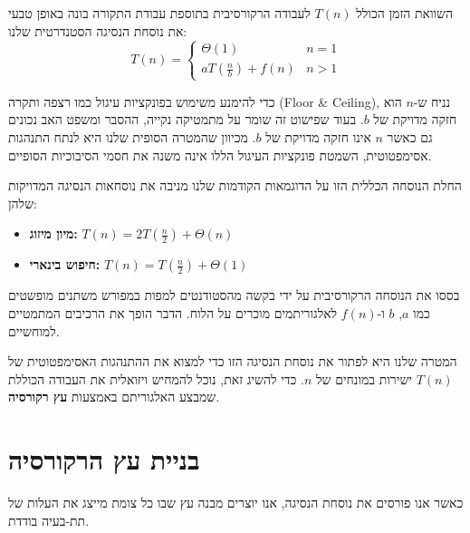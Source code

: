 \documentclass[11pt, a4paper]{article}
\begin{document}
השוואת הזמן הכולל $T(n)$ לעבודה הרקורסיבית בתוספת עבודת התקורה בונה באופן טבעי את נוסחת הנסיגה הסטנדרטית שלנו:
\[T(n)=\begin{cases}
    \Theta(1)  & n = 1 \\
   aT(\frac{n}{b})+f(n) & n>1
\end{cases}
\]

כדי להימנע משימוש בפונקציות עיגול כמו רצפה ותקרה (\textenglish{Floor \& Ceiling}), נניח ש-$n$ הוא חזקה מדויקת של $b$. בעוד שפישוט זה שומר על מתמטיקה נקייה, ההסבר ומשפט האב נכונים גם כאשר $n$ אינו חזקה מדויקת של $b$. מכיוון שהמטרה הסופית שלנו היא לנתח התנהגות אסימפטוטית, השמטת פונקציות העיגול הללו אינה משנה את חסמי הסיבוכיות הסופיים.

החלת הנוסחה הכללית הזו על הדוגמאות הקודמות שלנו מניבה את נוסחאות הנסיגה המדויקות שלהן:
\begin{itemize}
    \item \textbf{מיון מיזוג:} $T(n) = 2T\left(\frac{n}{2}\right) + \Theta(n)$
    \item \textbf{חיפוש בינארי:} $T(n) = T\left(\frac{n}{2}\right) + \Theta(1)$
\end{itemize}

\vspace{0.3cm}
\begin{educatortip}
בססו את הנוסחה הרקורסיבית על ידי בקשה מהסטודנטים למפות במפורש משתנים מופשטים כמו $a$, $b$ ו-$f(n)$ לאלגוריתמים מוכרים על הלוח. הדבר הופך את הרכיבים המתמטיים למוחשיים.
\end{educatortip}
\vspace{0.3cm}

המטרה שלנו היא לפתור את נוסחת הנסיגה הזו כדי למצוא את ההתנהגות האסימפטוטית של $T(n)$ ישירות במונחים של $n$. כדי להשיג זאת, נוכל להמחיש ויזואלית את העבודה הכוללת שמבצע האלגוריתם באמצעות \textbf{עץ רקורסיה}.
\newpage
\section*{בניית עץ הרקורסיה}
כאשר אנו פורסים את נוסחת הנסיגה, אנו יוצרים מבנה עץ שבו כל צומת מייצג את העלות של תת-בעיה בודדת.
\end{document}
